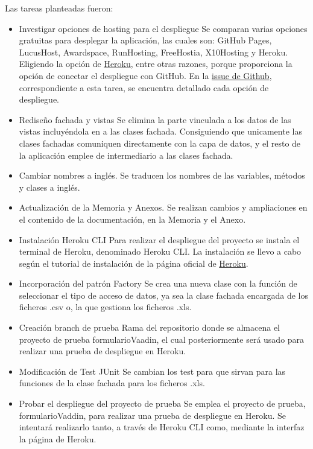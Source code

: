 Las tareas planteadas fueron:
\begin{itemize}
	\tightlist
	\item Investigar opciones de hosting para el despliegue
		Se comparan varias opciones gratuitas para desplegar la aplicación, las cuales son: GitHub Pages, LucusHost, Awardspace, RunHosting, FreeHostia, X10Hosting y Heroku. Eligiendo la opción de \href{https://dashboard.heroku.com/}{Heroku}, entre otras razones, porque proporciona la opción de conectar el despliegue con GitHub. En la \href{https://github.com/dbo1001/Gestor-TFG-2021/issues/26}{issue de Github}, correspondiente a esta tarea, se encuentra detallado cada opción de despliegue.
	\item Rediseño fachada y vistas
		Se elimina la parte vinculada a los datos de las vistas incluyéndola en a las clases fachada. Consiguiendo que unicamente las clases fachadas comuniquen directamente con la capa de datos, y el resto de la aplicación emplee de intermediario a las clases fachada.
	\item Cambiar nombres a inglés.
		Se traducen los nombres de las variables, métodos y clases a inglés.
	\item Actualización de la Memoria y Anexos.
		Se realizan cambios y ampliaciones en el contenido de la documentación, en la Memoria y el Anexo.
	\item Instalación Heroku CLI
		Para realizar el despliegue del proyecto se instala el terminal de Heroku, denominado Heroku CLI. La instalación se llevo a cabo según el tutorial de instalación de la página oficial de \href{https://devcenter.heroku.com/articles/heroku-cli}{Heroku}.
	\item Incorporación del patrón Factory 
		Se crea una nueva clase con la función de seleccionar el tipo de acceso de datos, ya sea la clase fachada encargada de los ficheros .csv o, la que gestiona los ficheros .xls.
	\item Creación branch de prueba
		Rama del repositorio donde se almacena el proyecto de prueba formularioVaadin, el cual posteriormente será usado para realizar una prueba de despliegue en Heroku.
	\item Modificación de Test JUnit
		Se cambian los test para que sirvan para las funciones de la clase fachada para los ficheros .xls. 
	\item Probar el despliegue del proyecto de prueba
		Se emplea el proyecto de prueba, formularioVaddin, para realizar una prueba de despliegue en Heroku. Se intentará realizarlo tanto, a través de Heroku CLI como, mediante la interfaz la página de Heroku.
	
\end{itemize}

